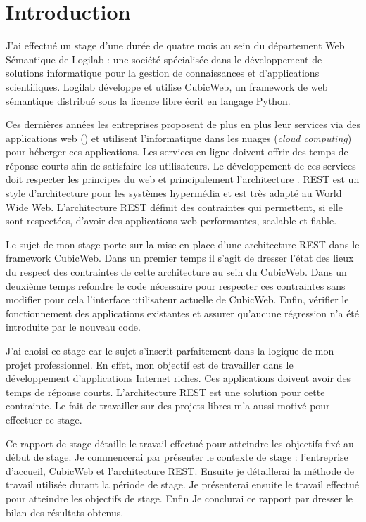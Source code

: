 \chapter*{Introduction} 
J'ai effectué un stage d'une durée de quatre mois au sein du département Web
Sémantique de Logilab : une société spécialisée dans le développement de
solutions informatique pour la gestion de connaissances et d'applications
scientifiques. Logilab développe et utilise CubicWeb, un framework de web
sémantique distribué sous la licence libre  écrit en
langage Python. 

Ces dernières années les entreprises proposent de plus en plus leur services
via des applications web (\textit{}) et
utilisent l'informatique dans les nuages (\textit{cloud computing}) pour
héberger ces applications. Les services en ligne doivent offrir des temps de
réponse courts afin de satisfaire les utilisateurs. Le développement de ces
services doit respecter les principes du web et principalement l'architecture
. REST est un style d'architecture pour les systèmes
hypermédia et est très adapté au World Wide Web. L'architecture REST définit
des contraintes qui permettent, si elle sont respectées, d'avoir des
applications web performantes, scalable et fiable.

Le sujet de mon stage porte sur la mise en place d'une architecture REST dans
le framework CubicWeb. Dans un premier temps il s'agit de dresser l'état des
lieux du respect des contraintes de cette architecture au sein du CubicWeb.
Dans un deuxième temps refondre le code nécessaire pour respecter ces
contraintes sans modifier pour cela l'interface utilisateur actuelle de 
CubicWeb. Enfin, vérifier le fonctionnement des applications existantes et
assurer qu'aucune régression n'a été introduite par le nouveau code.

J'ai choisi ce stage car le sujet s'inscrit parfaitement dans la logique de mon
projet professionnel. En effet, mon objectif est de travailler dans le
développement d'applications Internet riches. Ces applications doivent avoir
des temps de réponse courts. L'architecture REST est une solution pour cette
contrainte. Le fait de travailler sur des projets libres m'a aussi motivé pour
effectuer ce stage.

Ce rapport de stage détaille le travail effectué pour atteindre les objectifs
fixé au début de stage. Je commencerai par présenter le contexte de stage :
l'entreprise d'accueil, CubicWeb et l'architecture REST. Ensuite je détaillerai
la méthode de travail utilisée durant la période de stage. Je présenterai
ensuite le travail effectué pour atteindre les objectifs de stage. Enfin Je
conclurai ce rapport par dresser le bilan des résultats obtenus.
